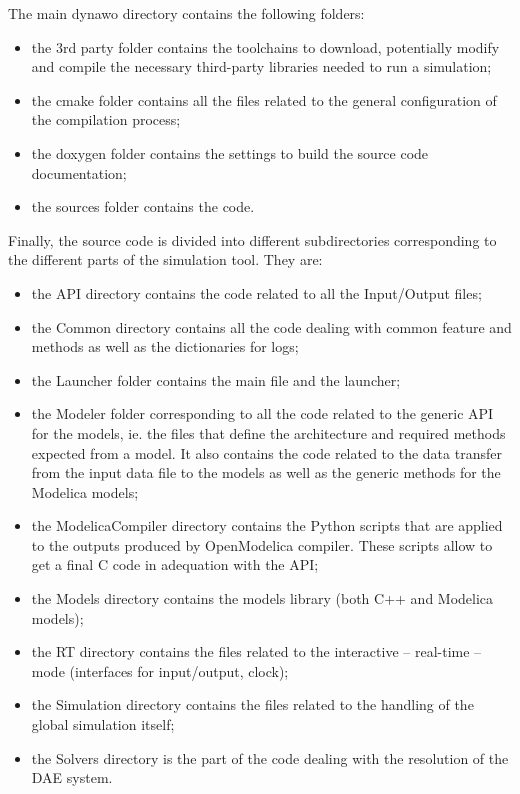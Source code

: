 \documentclass[a4paper, 12pt]{report}
\begin{document}
The main dynawo directory contains the following folders:
\begin{itemize}
\item the 3rd party folder contains the toolchains to download, potentially
modify and compile the necessary third-party libraries needed to run a \Dynawo
simulation;
\item the cmake folder contains all the files related to the general
configuration of the compilation process;
\item the doxygen folder contains the \Dynawo settings to build the source code
documentation;
\item the sources folder contains the \Dynawo code.
\end{itemize}

Finally, the source code is divided into different subdirectories corresponding to the different parts of the \Dynawo simulation tool. They are:
\begin{itemize}
\item the API directory contains the code related to all the Input/Output
files;
\item the Common directory contains all the code dealing with common feature and methods as well as the dictionaries for logs;
\item the Launcher folder contains the main file and the launcher;
\item the Modeler folder corresponding to all the code related to the generic
API for the models, ie. the files that define the architecture and required
methods expected from a model. It also contains the code related to the data transfer from the input data file to the models as well as the generic methods for the Modelica models;
\item the ModelicaCompiler directory contains the Python scripts that are
applied to the outputs produced by OpenModelica compiler. These scripts allow to
get a final C code in adequation with the \Dynawo API;
\item the Models directory contains the \Dynawo models library (both C++ and
Modelica models);
\item the RT directory contains the files related to the interactive -- real-time -- mode
(interfaces for input/output, clock);
\item the Simulation directory contains the files related to the handling
of the global simulation itself;
\item the Solvers directory is the part of the code dealing with the resolution of the DAE system.
\end{itemize}
\end{document}
